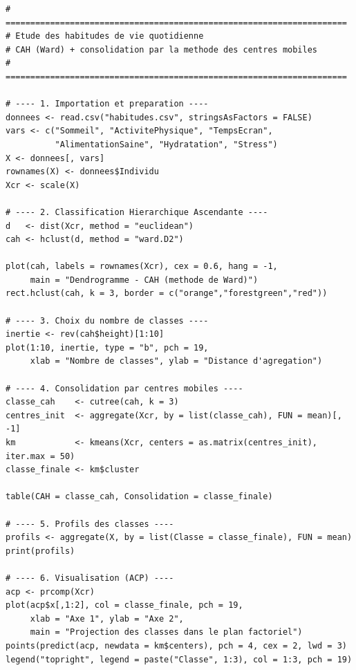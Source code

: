 \documentclass[11pt,a4paper,oneside]{book}
\begin{document}
\begin{lstlisting}[caption={Script R complet de l'étude}]
# =====================================================================
# Etude des habitudes de vie quotidienne
# CAH (Ward) + consolidation par la methode des centres mobiles
# =====================================================================

# ---- 1. Importation et preparation ----
donnees <- read.csv("habitudes.csv", stringsAsFactors = FALSE)
vars <- c("Sommeil", "ActivitePhysique", "TempsEcran",
          "AlimentationSaine", "Hydratation", "Stress")
X <- donnees[, vars]
rownames(X) <- donnees$Individu
Xcr <- scale(X)

# ---- 2. Classification Hierarchique Ascendante ----
d   <- dist(Xcr, method = "euclidean")
cah <- hclust(d, method = "ward.D2")

plot(cah, labels = rownames(Xcr), cex = 0.6, hang = -1,
     main = "Dendrogramme - CAH (methode de Ward)")
rect.hclust(cah, k = 3, border = c("orange","forestgreen","red"))

# ---- 3. Choix du nombre de classes ----
inertie <- rev(cah$height)[1:10]
plot(1:10, inertie, type = "b", pch = 19,
     xlab = "Nombre de classes", ylab = "Distance d'agregation")

# ---- 4. Consolidation par centres mobiles ----
classe_cah    <- cutree(cah, k = 3)
centres_init  <- aggregate(Xcr, by = list(classe_cah), FUN = mean)[, -1]
km            <- kmeans(Xcr, centers = as.matrix(centres_init), iter.max = 50)
classe_finale <- km$cluster

table(CAH = classe_cah, Consolidation = classe_finale)

# ---- 5. Profils des classes ----
profils <- aggregate(X, by = list(Classe = classe_finale), FUN = mean)
print(profils)

# ---- 6. Visualisation (ACP) ----
acp <- prcomp(Xcr)
plot(acp$x[,1:2], col = classe_finale, pch = 19,
     xlab = "Axe 1", ylab = "Axe 2",
     main = "Projection des classes dans le plan factoriel")
points(predict(acp, newdata = km$centers), pch = 4, cex = 2, lwd = 3)
legend("topright", legend = paste("Classe", 1:3), col = 1:3, pch = 19)
\end{lstlisting}
\end{document}
